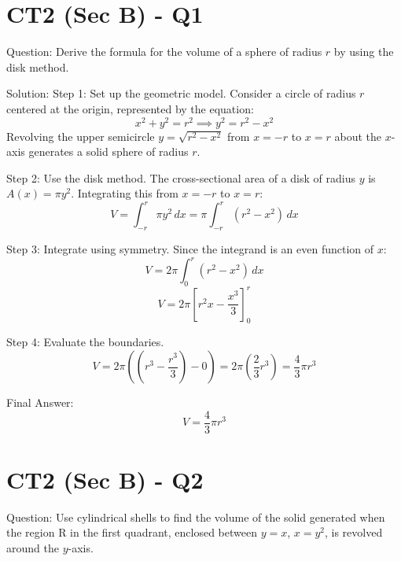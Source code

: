 \documentclass{article}
\begin{document}
\section*{CT2 (Sec B) - Q1}
Question:
Derive the formula for the volume of a sphere of radius $r$ by using the disk method.

Solution:
Step 1: Set up the geometric model.
Consider a circle of radius $r$ centered at the origin, represented by the equation:
\[
x^2 + y^2 = r^2 \implies y^2 = r^2 - x^2
\]
Revolving the upper semicircle $y = \sqrt{r^2 - x^2}$ from $x = -r$ to $x = r$ about the $x$-axis generates a solid sphere of radius $r$.

Step 2: Use the disk method.
The cross-sectional area of a disk of radius $y$ is $A(x) = \pi y^2$. Integrating this from $x = -r$ to $x = r$:
\[
V = \int_{-r}^{r} \pi y^2 \, dx = \pi \int_{-r}^{r} (r^2 - x^2) \, dx
\]

Step 3: Integrate using symmetry.
Since the integrand is an even function of $x$:
\[
V = 2\pi \int_{0}^{r} (r^2 - x^2) \, dx
\]
\[
V = 2\pi \left[ r^2 x - \frac{x^3}{3} \right]_{0}^{r}
\]

Step 4: Evaluate the boundaries.
\[
V = 2\pi \left( \left(r^3 - \frac{r^3}{3}\right) - 0 \right) = 2\pi \left( \frac{2}{3} r^3 \right) = \frac{4}{3} \pi r^3
\]

Final Answer:
\[
\boxed{V = \frac{4}{3}\pi r^3}
\]

\section*{CT2 (Sec B) - Q2}
Question:
Use cylindrical shells to find the volume of the solid generated when the region R in the first quadrant, enclosed between $y = x$, $x = y^2$, is revolved around the $y$-axis.
\end{document}
